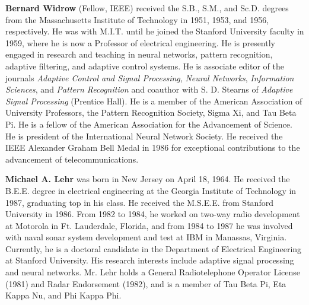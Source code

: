 \documentclass[10pt,twocolumn]{article}
\begin{document}
\vspace{1em}
\noindent\textbf{Bernard Widrow} (Fellow, IEEE) received the S.B., S.M., and Sc.D.
degrees from the Massachusetts Institute of Technology in 1951, 1953, and 1956,
respectively. He was with M.I.T. until he joined the Stanford University faculty
in 1959, where he is now a Professor of electrical engineering. He is presently
engaged in research and teaching in neural networks, pattern recognition,
adaptive filtering, and adaptive control systems. He is associate editor of the
journals \textit{Adaptive Control and Signal Processing}, \textit{Neural
Networks}, \textit{Information Sciences}, and \textit{Pattern Recognition} and
coauthor with S. D. Stearns of \textit{Adaptive Signal Processing} (Prentice
Hall). He is a member of the American Association of University Professors, the
Pattern Recognition Society, Sigma Xi, and Tau Beta Pi. He is a fellow of the
American Association for the Advancement of Science. He is president of the
International Neural Network Society. He received the IEEE Alexander Graham Bell
Medal in 1986 for exceptional contributions to the advancement of
telecommunications.

\vspace{0.6em}
\noindent\textbf{Michael A. Lehr} was born in New Jersey on April 18, 1964. He
received the B.E.E. degree in electrical engineering at the Georgia Institute of
Technology in 1987, graduating top in his class. He received the M.S.E.E. from
Stanford University in 1986. From 1982 to 1984, he worked on two-way radio
development at Motorola in Ft. Lauderdale, Florida, and from 1984 to 1987 he was
involved with naval sonar system development and test at IBM in Manassas,
Virginia. Currently, he is a doctoral candidate in the Department of Electrical
Engineering at Stanford University. His research interests include adaptive
signal processing and neural networks. Mr. Lehr holds a General Radiotelephone
Operator License (1981) and Radar Endorsement (1982), and is a member of Tau Beta
Pi, Eta Kappa Nu, and Phi Kappa Phi.
\end{document}
